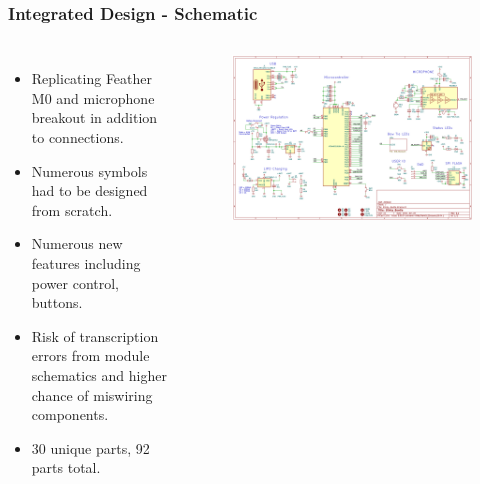 \documentclass[aspectratio=169, t]{beamer}
\begin{document}
\begin{frame}
\frametitle{Integrated Design - Schematic}
\vspace{-5mm}
\begin{columns}
	\begin{itemize}
		\item Replicating Feather M0 and microphone breakout in addition to connections.
		\item Numerous symbols had to be designed from scratch.
		\item Numerous new features including power control, buttons.
		\item Risk of transcription errors from module schematics and higher chance of miswiring components.
		\item 30 unique parts, 92 parts total.
	\end{itemize}
	\begin{figure}
		\includegraphics[width=\linewidth]{images/integrated-schematic.png}
	\end{figure}
\end{columns}
\end{frame}
\end{document}
